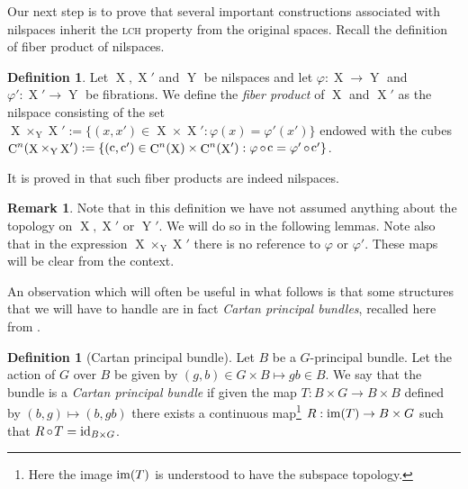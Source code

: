 \documentclass[a4paper,12pt,reqno]{amsart}
\theoremstyle{definition}
\newtheorem{defn}[theorem]{Definition}
\newtheorem{remark}[theorem]{Remark}
\def\to{\rightarrow}
\def\im{{\rm im}}
\newcommand{\id}{\mathrm{id}}
\DeclareMathOperator{\q}{c}
\DeclareMathOperator{\ns}{X}
\DeclareMathOperator{\nss}{Y}
\DeclareMathOperator{\co}{\circ\hspace{-0.02 cm}}
\DeclareMathOperator{\cu}{C}
\begin{document}
\noindent Our next step is to prove that several important constructions associated with nilspaces inherit the \textsc{lch} property from the original spaces. Recall the definition of fiber product of nilspaces.
\begin{defn}\label{def:fib-prod}
Let $\ns, \ns'$ and $\nss$ be nilspaces and let $\varphi:\ns\to\nss$ and $\varphi':\ns'\to\nss$ be fibrations. We define the \emph{fiber product} of $\ns$ and $\ns'$ as the nilspace consisting of the set $\ns\times_{\nss}\ns':=\{(x,x')\in \ns\times\ns': \varphi(x)=\varphi'(x')\}$ endowed with the cubes $\cu^n(\ns \times_{\nss} \ns'):=\{(\q,\q')\in \cu^n(\ns)\times \cu^n(\ns'):\varphi\co\q=\varphi'\co\q'\}$.
\end{defn}
It is proved in \cite[Lemma 4.2]{CGSS} that such fiber products are indeed nilspaces.
\begin{remark}
Note that in this definition we have not assumed anything about the topology on $\ns,\ns'$ or $\nss'$. We will do so in the following lemmas. Note also that in the expression $\ns\times_{\nss}\ns'$ there is no reference to $\varphi$ or $\varphi'$. These maps will be clear from the context.
\end{remark}

\noindent An observation which will often be useful in what follows is that some structures that we will have to handle are in fact \emph{Cartan principal bundles}, recalled here from \cite[1.1.2 Definition]{P61}.
\begin{defn}[Cartan principal bundle]\label{def:Cartan}
Let $B$ be a $G$-principal bundle. Let the action of $G$ over $B$ be given by $(g,b)\in G\times B\mapsto  gb\in B$. We say that the bundle is a \emph{Cartan principal bundle} if given the map $T:B\times G\to B\times B$ defined by $(b,g)\mapsto(b,gb)$ there exists a continuous map\footnote{Here the image $\im(T)$ is understood to have the subspace topology.} $R:\im(T)\to B\times G$ such that $R\co T=\id_{B\times G}$.
\end{defn}
\end{document}
